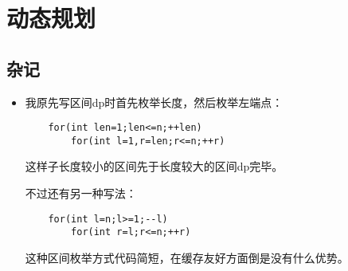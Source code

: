 \chapter{动态规划}
\minitoc











\section{杂记}
\begin{itemize}
    \item 我原先写区间dp时首先枚举长度，然后枚举左端点：
    \begin{lstlisting}
    for(int len=1;len<=n;++len)
        for(int l=1,r=len;r<=n;++r)
    \end{lstlisting}

    这样子长度较小的区间先于长度较大的区间dp完毕。

    不过还有另一种写法：
    \begin{lstlisting}
    for(int l=n;l>=1;--l)
        for(int r=l;r<=n;++r)
    \end{lstlisting}

    这种区间枚举方式代码简短，在缓存友好方面倒是没有什么优势。
\end{itemize}
